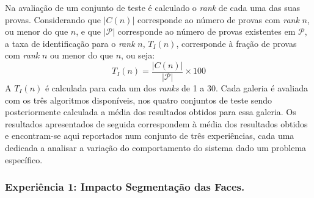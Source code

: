 \documentclass{llncs}
\begin{document}
Na avaliação de um conjunto de teste é calculado o \textit{rank} de cada uma das suas provas. Considerando que $|C(n)|$ corresponde ao número de provas com \textit{rank} $n$, ou menor do que $n$, e que $|\mathscr{P}|$ corresponde ao número de provas existentes em $\mathscr{P}$, a taxa de identificação para o \textit{rank} $n$, $T_{I}(n)$, corresponde à fração de provas com \textit{rank} $n$ ou menor do que $n$, ou seja:
\begin{equation}
T_{I}(n) = \frac{|C(n)|}{|\mathscr{P}|} \times 100
\end{equation}
A $T_{I}(n)$ é calculada para cada um dos \textit{ranks} de 1 a 30. Cada galeria é avaliada com os três algoritmos disponíveis, nos quatro conjuntos de teste sendo posteriormente calculada a média dos resultados obtidos para essa galeria. Os resultados apresentados de seguida correspondem à média dos resultados obtidos e encontram-se aqui reportados num conjunto de três experiências, cada uma dedicada a analisar a variação do comportamento do sistema dado um problema específico.

\subsubsection{Experiência 1: Impacto Segmentação das Faces.}
\end{document}
